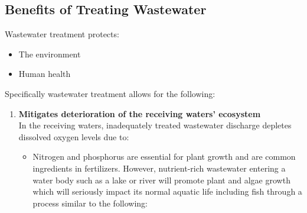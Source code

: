 \subsection{Benefits of Treating Wastewater}
Wastewater treatment protects:
\begin{itemize}
\item The environment
\item Human health
\end{itemize}

Specifically wastewater treatment allows for the following:

\begin{enumerate}
\item \textbf{Mitigates deterioration of the receiving waters' ecosystem }\\
In the receiving waters, inadequately treated wastewater discharge depletes dissolved oxygen levels due to:

\begin{itemize}

\item Nitrogen and phosphorus are essential for plant growth and are common ingredients in fertilizers. However, nutrient-rich wastewater entering a water body such as a lake or river will promote plant and algae growth which will seriously impact its normal aquatic life including fish through a process similar to the following:


\end{itemize}
\end{enumerate}
